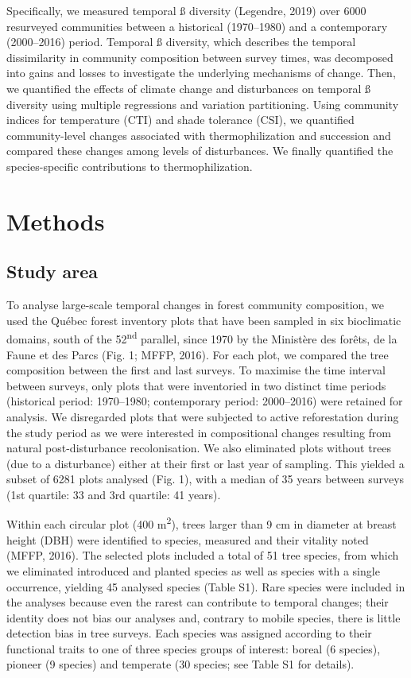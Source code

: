 \documentclass[
  a4paperpaper,
]{article}
\begin{document}
Specifically, we measured temporal ß diversity (Legendre, 2019) over
6000 resurveyed communities between a historical (1970--1980) and a
contemporary (2000--2016) period. Temporal ß diversity, which describes
the temporal dissimilarity in community composition between survey
times, was decomposed into gains and losses to investigate the
underlying mechanisms of change. Then, we quantified the effects of
climate change and disturbances on temporal ß diversity using multiple
regressions and variation partitioning. Using community indices for
temperature (CTI) and shade tolerance (CSI), we quantified
community-level changes associated with thermophilization and succession
and compared these changes among levels of disturbances. We finally
quantified the species-specific contributions to thermophilization.

\hypertarget{methods}{%
\section{Methods}\label{methods}}

\hypertarget{study-area}{%
\subsection{Study area}\label{study-area}}

To analyse large-scale temporal changes in forest community composition,
we used the Québec forest inventory plots that have been sampled in six
bioclimatic domains, south of the 52\textsuperscript{nd} parallel, since
1970 by the Ministère des forêts, de la Faune et des Parcs (Fig. 1;
MFFP, 2016). For each plot, we compared the tree composition between the
first and last surveys. To maximise the time interval between surveys,
only plots that were inventoried in two distinct time periods
(historical period: 1970--1980; contemporary period: 2000--2016) were
retained for analysis. We disregarded plots that were subjected to
active reforestation during the study period as we were interested in
compositional changes resulting from natural post-disturbance
recolonisation. We also eliminated plots without trees (due to a
disturbance) either at their first or last year of sampling. This
yielded a subset of 6281 plots analysed (Fig. 1), with a median of 35
years between surveys (1st quartile: 33 and 3rd quartile: 41 years).

Within each circular plot (400 m\textsuperscript{2}), trees larger than
9 cm in diameter at breast height (DBH) were identified to species,
measured and their vitality noted (MFFP, 2016). The selected plots
included a total of 51 tree species, from which we eliminated introduced
and planted species as well as species with a single occurrence,
yielding 45 analysed species (Table S1). Rare species were included in
the analyses because even the rarest can contribute to temporal changes;
their identity does not bias our analyses and, contrary to mobile
species, there is little detection bias in tree surveys. Each species
was assigned according to their functional traits to one of three
species groups of interest: boreal (6 species), pioneer (9 species) and
temperate (30 species; see Table S1 for details).
\end{document}

